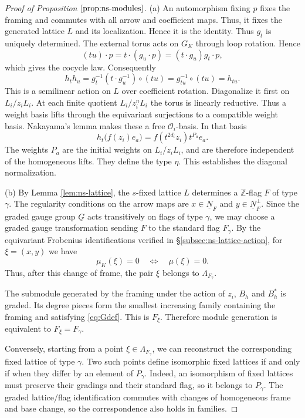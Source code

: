 \documentclass[11pt,reqno]{amsart}
\theoremstyle{definition}
\theoremstyle{remark}
\def\bbZ{\mathbb Z}
\def\dN{\underline N}
\def\dG{\underline G}
\providecommand{\calO}{\mathcal O}
\begin{document}
\begin{proof}[Proof of Proposition $\ref{prop:ns-modules}$]\hfill

(a) An automorphism fixing $p$ fixes the framing and commutes with
all arrow and coefficient maps. Thus, it fixes the generated
lattice $L$ and its localization. Hence it is the identity. Thus $g_t$ is uniquely determined. 
The external torus acts on $G_K$ through loop rotation. Hence
\[
 (tu)\cdot p=t\cdot(g_u\cdot p)
          =(t\cdot g_u)g_t\cdot p,
\]
which gives the cocycle law.
Consequently
\[
 h_t h_u=g_t^{-1}(t\cdot g_u^{-1})\circ(tu)
        =g_{tu}^{-1}\circ(tu)=h_{tu}.
\]
This is a semilinear action on $L$ over coefficient rotation.
Diagonalize it first on $L_i/z_iL_i$. At each finite quotient
$L_i/z_i^nL_i$ the torus is linearly reductive. Thus a weight
basis lifts through the equivariant surjections to a compatible
weight basis. Nakayama's lemma makes these a free $\calO_i$-basis.
In that basis
\[
 h_t\bigl(f(z_i)e_a\bigr)=f(t^{2d_i}z_i)t^{P_a}e_a.
\]
The weights $P_a$ are the initial weights on $L_i/z_iL_i$, and are therefore
independent of the homogeneous lifts. They define the type $\eta$.
This establishes the diagonal normalization. 

(b) By Lemma \ref{lem:ns-lattice}, the $s$-fixed lattice $L$
determines a $\bbZ$-flag $F$ of type $\gamma$. The regularity
conditions on the arrow maps are $x\in\dN_F$ and
$y\in\dN_F^\perp$. Since the graded gauge group $\dG$ acts
transitively on flags of type $\gamma$, we may choose a graded gauge
transformation sending $F$ to the standard flag $F_\gamma$.
By the equivariant Frobenius identifications verified in
\S\ref{subsec:ns-lattice-action}, for $\xi=(x,y)$ we have
\[
 \mu_K(\xi)=0\quad\Longleftrightarrow\quad\mu(\xi)=0.
\]
Thus, after this change of frame, the pair $\xi$ belongs to $\Lambda_{F_\gamma}$. 

The submodule generated by the framing under the action of $z_i$, $B_h$ and
$B_h^*$ is graded. Its degree pieces form the smallest increasing
family containing the framing and satisfying \eqref{eq:Gdef}.
This is $F_\xi$. Therefore
module generation is equivalent to $F_\xi=F_\gamma$.

Conversely, starting from a point $\xi\in\Lambda_{F_\gamma}$, we can reconstruct the corresponding fixed lattice of type $\gamma$. Two 
such points define isomorphic fixed lattices if and only if when they differ by an element of $P_\gamma$. Indeed, an isomorphism of fixed lattices 
must preserve their gradings and their standard flag, so it belongs to $P_\gamma$. 
The graded lattice/flag identification commutes with changes of
homogeneous frame and base change, so the correspondence also holds in families.


\end{proof}
\end{document}
